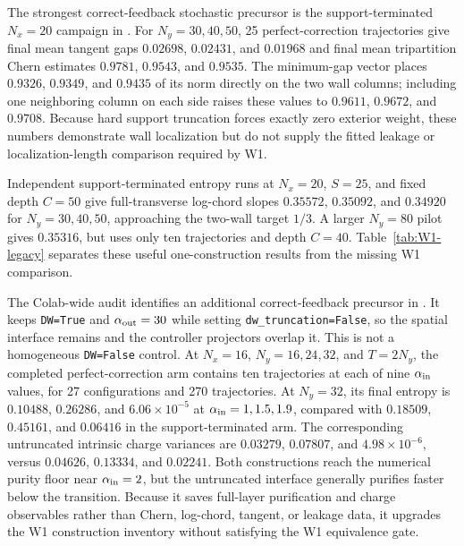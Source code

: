\documentclass[aps,prx,twocolumn,floatfix,nofootinbib,superscriptaddress,longbibliography]{revtex4-2}
\newcommand{\code}[1]{\texttt{#1}}
\begin{document}
The strongest correct-feedback stochastic precursor is the support-terminated
$N_x=20$ campaign in
.  For $N_y=30,40,50$, 25
perfect-correction trajectories give final mean tangent gaps $0.02698$, $0.02431$, and
$0.01968$ and final mean tripartition Chern estimates $0.9781$, $0.9543$, and $0.9535$.
The minimum-gap vector places $0.9326$, $0.9349$, and $0.9435$ of its norm directly on
the two wall columns; including one neighboring column on each side raises these values
to $0.9611$, $0.9672$, and $0.9708$.  Because hard support truncation forces exactly
zero exterior weight, these numbers demonstrate wall localization but do not supply the
fitted leakage or localization-length comparison required by W1.

Independent support-terminated entropy runs at $N_x=20$, $S=25$, and fixed depth
$C=50$ give full-transverse log-chord slopes $0.35572$, $0.35092$, and $0.34920$ for
$N_y=30,40,50$, approaching the two-wall target $1/3$.  A larger $N_y=80$ pilot gives
$0.35316$, but uses only ten trajectories and depth $C=40$.  Table~\ref{tab:W1-legacy}
separates these useful one-construction results from the missing W1 comparison.

The Colab-wide audit identifies an additional correct-feedback precursor in
.
It keeps \code{DW=True} and $\alpha_{\rm out}=30$ while setting
\code{dw\_truncation=False}, so the spatial interface remains and the controller
projectors overlap it.  This is not a homogeneous \code{DW=False} control.  At
$N_x=16$, $N_y=16,24,32$, and $T=2N_y$, the completed perfect-correction arm contains
ten trajectories at each of nine $\alpha_{\rm in}$ values, for 27 configurations and
270 trajectories.  At $N_y=32$, its final entropy is $0.10488$, $0.26286$, and
$6.06\times10^{-5}$ at $\alpha_{\rm in}=1,1.5,1.9$, compared with $0.18509$, $0.45161$,
and $0.06416$ in the support-terminated arm.  The corresponding untruncated intrinsic
charge variances are $0.03279$, $0.07807$, and $4.98\times10^{-6}$, versus $0.04626$,
$0.13334$, and $0.02241$.  Both constructions reach the numerical purity floor near
$\alpha_{\rm in}=2$, but the untruncated interface generally purifies faster below the
transition.  Because it saves full-layer purification and charge observables rather than
Chern, log-chord, tangent, or leakage data, it upgrades the W1 construction inventory
without satisfying the W1 equivalence gate.
\end{document}
